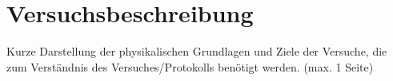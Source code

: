 \section{Versuchsbeschreibung}
Kurze Darstellung der physikalischen Grundlagen und 
Ziele der Versuche, die zum Verständnis des Versuches/Protokolls benötigt 
werden. 
(max. 1 Seite)